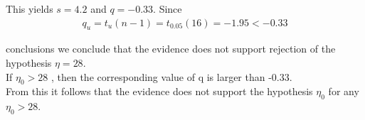 \documentclass{beamer}
\begin{document}
\begin{frame}
This yields $s=4.2$ and $q=-0.33$. Since
\begin{align}
q_u=t_u(n-1)=t_{0.05}(16)=-1.95<-0.33\nonumber
\end{align}
\begin{block}{conclusions}
we conclude that the evidence does not support rejection of the hypothesis $\eta=28$.\\
If $\eta_0>28$ , then the corresponding value of q is larger than -0.33.\\From this it follows that the evidence does not support the hypothesis $\eta_0$ for any $\eta_0>28$.
\end{block}

\end{frame}
\end{document}

